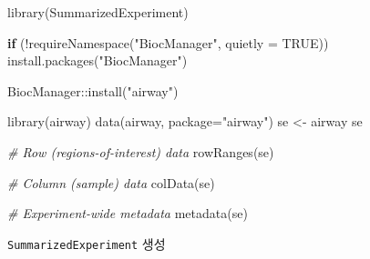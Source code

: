 \documentclass[
]{book}
\newenvironment{Shaded}{\begin{snugshade}}{\end{snugshade}}
\newcommand{\AttributeTok}[1]{\textcolor[rgb]{0.77,0.63,0.00}{#1}}
\newcommand{\CommentTok}[1]{\textcolor[rgb]{0.56,0.35,0.01}{\textit{#1}}}
\newcommand{\ConstantTok}[1]{\textcolor[rgb]{0.00,0.00,0.00}{#1}}
\newcommand{\ControlFlowTok}[1]{\textcolor[rgb]{0.13,0.29,0.53}{\textbf{#1}}}
\newcommand{\FunctionTok}[1]{\textcolor[rgb]{0.00,0.00,0.00}{#1}}
\newcommand{\NormalTok}[1]{#1}
\newcommand{\OtherTok}[1]{\textcolor[rgb]{0.56,0.35,0.01}{#1}}
\newcommand{\SpecialCharTok}[1]{\textcolor[rgb]{0.00,0.00,0.00}{#1}}
\newcommand{\StringTok}[1]{\textcolor[rgb]{0.31,0.60,0.02}{#1}}
\begin{document}
\begin{Shaded}
\begin{Highlighting}[]
\FunctionTok{library}\NormalTok{(SummarizedExperiment)}

\ControlFlowTok{if}\NormalTok{ (}\SpecialCharTok{!}\FunctionTok{requireNamespace}\NormalTok{(}\StringTok{"BiocManager"}\NormalTok{, }\AttributeTok{quietly =} \ConstantTok{TRUE}\NormalTok{))}
    \FunctionTok{install.packages}\NormalTok{(}\StringTok{"BiocManager"}\NormalTok{)}

\NormalTok{BiocManager}\SpecialCharTok{::}\FunctionTok{install}\NormalTok{(}\StringTok{"airway"}\NormalTok{)}

\FunctionTok{library}\NormalTok{(airway)}
\FunctionTok{data}\NormalTok{(airway, }\AttributeTok{package=}\StringTok{"airway"}\NormalTok{)}
\NormalTok{se }\OtherTok{\textless{}{-}}\NormalTok{ airway}
\NormalTok{se}

\CommentTok{\# Row (regions{-}of{-}interest) data}
\FunctionTok{rowRanges}\NormalTok{(se)}

\CommentTok{\# Column (sample) data}
\FunctionTok{colData}\NormalTok{(se)}

\CommentTok{\# Experiment{-}wide metadata}
\FunctionTok{metadata}\NormalTok{(se)}
\end{Highlighting}
\end{Shaded}

\texttt{SummarizedExperiment} 생성
\end{document}
